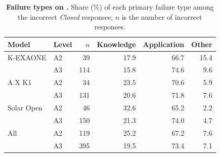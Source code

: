 \begin{table}[t]
\centering
\small
\setlength{\tabcolsep}{4pt}
\caption{\textbf{Failure types on \name{}.}
Share (\%) of each primary failure type among the incorrect \textit{Closed} responses; $n$ is the number of incorrect responses.}
\label{tab:failure_contrast}
\begin{tabular}{@{}llrrrr@{}}
\toprule
\textbf{Model} & \textbf{Level} & $n$ & \textbf{Knowledge} & \textbf{Application} & \textbf{Other} \\
\midrule
K-EXAONE   & A2 & 39  & 17.9 & 66.7 & 15.4 \\
           & A3 & 114 & 15.8 & 74.6 & 9.6  \\
A.X K1     & A2 & 34  & 23.5 & 70.6 & 5.9  \\
           & A3 & 131 & 20.6 & 71.8 & 7.6  \\
Solar Open & A2 & 46  & 32.6 & 65.2 & 2.2  \\
           & A3 & 150 & 21.3 & 74.0 & 4.7  \\
\midrule
All        & A2 & 119 & 25.2 & 67.2 & 7.6  \\
           & A3 & 395 & 19.5 & 73.4 & 7.1  \\
\bottomrule
\end{tabular}
\end{table}